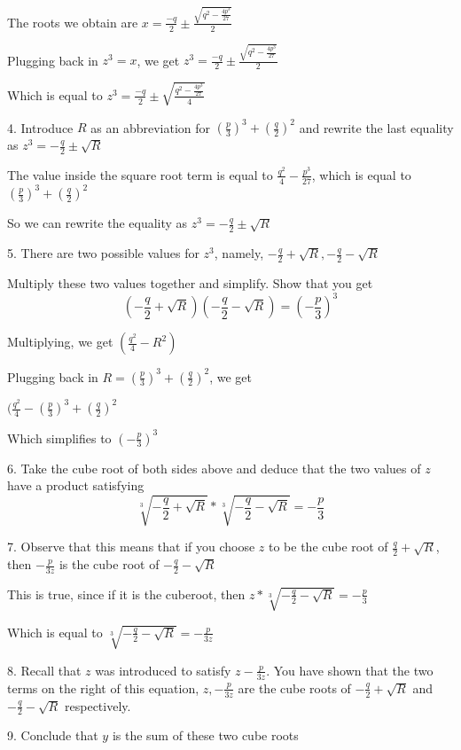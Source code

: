 \documentclass[12pt]{article}
\begin{document}
\begin{itemize}
	The roots we obtain are $x = \frac{-q}{2} \pm \frac{\sqrt{q^2 - \frac{4p^3}{27}}}{2}$

	Plugging back in $z^3 = x$, we get $z^3 = \frac{-q}{2} \pm \frac{\sqrt{q^2 - \frac{4p^3}{27}}}{2}$

	Which is equal to $z^3 = \frac{-q}{2} \pm \sqrt{\frac{q^2 - \frac{4p^3}{27}}{4}}$

	4.  Introduce $R$ as an abbreviation for $(\frac{p}{3})^3 + (\frac{q}{2})^2$ and rewrite the last equality as $z^3 = -\frac{q}{2} \pm \sqrt{R}$

	The value inside the square root term is equal to $\frac{q^2}{4} - \frac{p^3}{27}$, which is equal to $(\frac{p}{3})^3+ (\frac{q}{2})^2$

	So we can rewrite the equality as $z^3 = -\frac{q}{2} \pm \sqrt{R}$

	5. There are two possible values for $z^3$, namely, $-\frac{q}{2} + \sqrt{R}, -\frac{q}{2} - \sqrt{R}$

	Multiply these two values together and simplify. Show that you get $$(-\frac{q}{2} + \sqrt{R})(-\frac{q}{2} - \sqrt{R}) = (-\frac{p}{3})^3$$

	Multiplying, we get $(\frac{q^2}{4} - R^2)$

	Plugging back in $R = (\frac{p}{3})^3 + (\frac{q}{2})^2$, we get

	$(\frac{q^2}{4} - (\frac{p}{3})^3 + (\frac{q}{2})^2$

	Which simplifies to $(-\frac{p}{3})^3$

	6. Take the cube root of both sides above and deduce that the two values of $z$ have a product satisfying $$\sqrt[3]{-\frac{q}{2} + \sqrt{R}} * \sqrt[3]{-\frac{q}{2} - \sqrt{R}} = -\frac{p}{3}$$

	7. Observe that this means that if you choose $z$ to be the cube root of $\frac{q}{2} + \sqrt{R}$, then $-\frac{p}{3z}$ is the cube root of $-\frac{q}{2} - \sqrt{R}$

	This is true, since if it is the cuberoot, then $z*\sqrt[3]{-\frac{q}{2} - \sqrt{R}} = -\frac{p}{3}$

	Which is equal to $\sqrt[3]{-\frac{q}{2} -\sqrt{R}} = -\frac{p}{3z}$

	8. Recall that $z$ was introduced to satisfy $z - \frac{p}{3z}$. You have shown that the two terms on the right of this equation, $z, -\frac{p}{3z}$ are the cube roots of $-\frac{q}{2} + \sqrt{R}$ and $-\frac{q}{2} - \sqrt{R}$ respectively.

	9. Conclude that $y$ is the sum of these two cube roots


\end{itemize}
\end{document}
